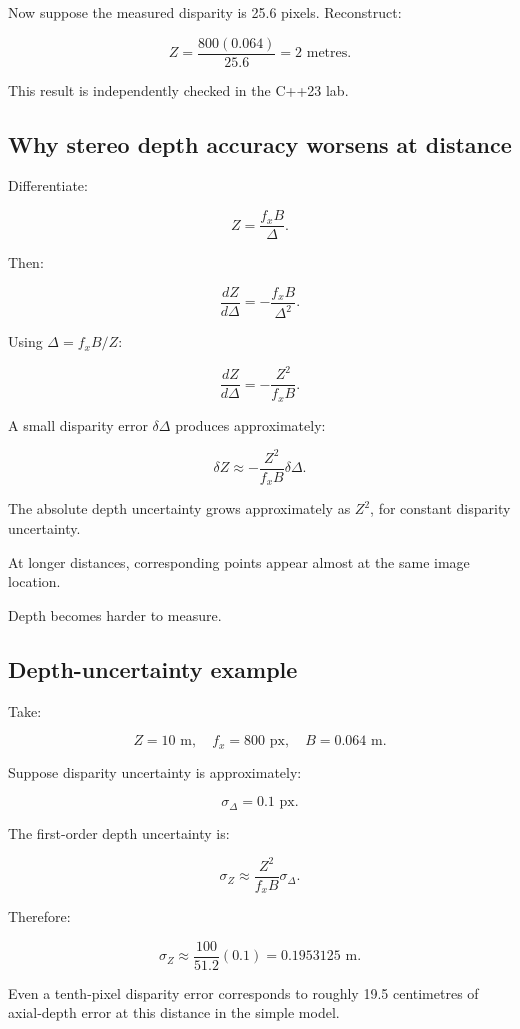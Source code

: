 Now suppose the measured disparity is 25.6 pixels. Reconstruct:

\[ Z=\frac{800(0.064)}{25.6} =\boxed{2\text{ metres}}. \]

This result is independently checked in the C++23 lab.

\subsection{Why stereo depth accuracy worsens at distance}\label{02-foundations-ii-ch035-why-stereo-depth-accuracy-worsens-at-distance}

Differentiate:

\[ Z=\frac{f_xB}{\Delta}. \]

Then:

\[ \frac{dZ}{d\Delta} = -\frac{f_xB}{\Delta^2}. \]

Using \(\Delta=f_xB/Z\):

\[ \boxed{ \frac{dZ}{d\Delta} = -\frac{Z^2}{f_xB}. } \]

A small disparity error \(\delta\Delta\) produces approximately:

\[ \boxed{ \delta Z\approx -\frac{Z^2}{f_xB}\delta\Delta. } \]

The absolute depth uncertainty grows approximately as \(Z^2\), for constant disparity uncertainty.

At longer distances, corresponding points appear almost at the same image location.

Depth becomes harder to measure.

\subsection{Depth-uncertainty example}\label{02-foundations-ii-ch035-depth-uncertainty-example}

Take:

\[ Z=10\text{ m},\quad f_x=800\text{ px},\quad B=0.064\text{ m}. \]

Suppose disparity uncertainty is approximately:

\[ \sigma_\Delta=0.1\text{ px}. \]

The first-order depth uncertainty is:

\[ \sigma_Z\approx \frac{Z^2}{f_xB}\sigma_\Delta. \]

Therefore:

\[ \sigma_Z\approx \frac{100}{51.2}(0.1) =\boxed{0.1953125\text{ m}}. \]

Even a tenth-pixel disparity error corresponds to roughly 19.5 centimetres of axial-depth error at this distance in the simple model.

